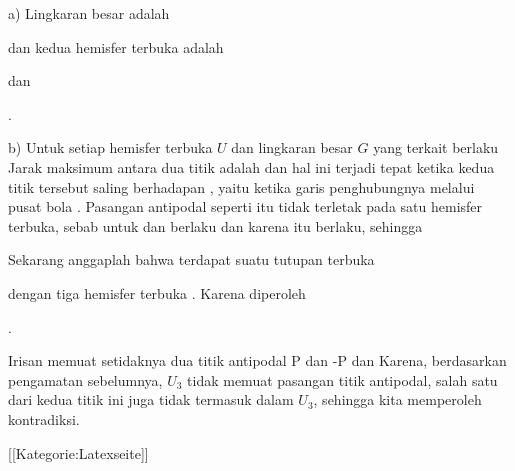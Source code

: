 a) Lingkaran besar adalah

 {  }

dan kedua hemisfer terbuka adalah

 {  }

dan

 { . }

b) Untuk setiap hemisfer terbuka $U$ dan lingkaran besar $G$ yang terkait berlaku
 Jarak maksimum antara dua titik
 adalah
 dan hal ini terjadi tepat ketika kedua titik tersebut saling berhadapan
 {} {}, yaitu ketika garis penghubungnya melalui pusat bola
 {} {}. Pasangan antipodal seperti itu tidak terletak pada satu hemisfer terbuka, sebab untuk
 dan
 berlaku
 dan karena itu
 berlaku, sehingga

Sekarang anggaplah bahwa terdapat suatu tutupan terbuka

 {  }

dengan tiga hemisfer terbuka
 {} {.}
Karena
 diperoleh

 { . }

Irisan
 memuat setidaknya dua titik antipodal
\mathkor {} {P} {dan} {-P} {}
dan
 Karena, berdasarkan pengamatan sebelumnya, $U_3$ tidak memuat pasangan titik antipodal, salah satu dari kedua titik ini juga tidak termasuk dalam $U_3$, sehingga kita memperoleh kontradiksi.

 [[Kategorie:Latexseite]]
